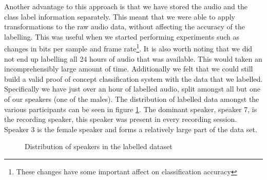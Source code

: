 \documentclass[ %
                    author={Sam Phippen},
                supervisor={Dr. Rafal Bogacz},
                     title={Real time voice activity detectors in noisy personal computing environments},
                  subtitle={},
                    degree={MEng},
                      year={2012} ]{thesis}
\begin{document}
Another advantage to this approach is that we have stored the audio and the
class label information separately. This meant that we were able to apply
transformations to the raw audio data, without affecting the accuracy of the
labelling. This was useful when we started performing experiments such as
changes in bits per sample and frame rate\footnote{These changes have some
important affect on classification accuracy}. It is also worth noting that we
did not end up labelling all 24 hours of audio that was available. This would
taken an incomprehensibly large amount of time. Additionally we felt that we
could still build a valid proof of concept classification system with the data
that we labelled. Specifically we have just over an hour of labelled audio,
split amongst all but one of our speakers (one of the males). The distribution
of labelled data amongst the various participants can be seen in figure
\ref{img:speaker_distribution}. The dominant speaker, speaker 7, is the
recording speaker, this speaker was present in every recording session. Speaker
3 is the female speaker and forms a relatively large part of the data set.

\begin{figure}
    \caption{Distribution of speakers in the labelled dataset}
    \label{img:speaker_distribution}
\end{figure}
\end{document}
